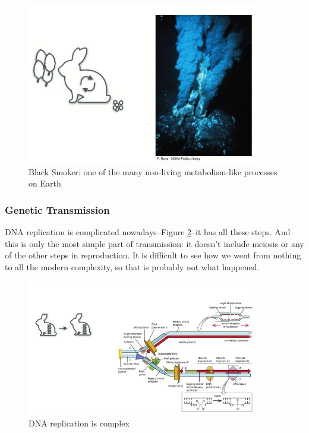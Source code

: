 \documentclass[]{article}
\begin{document}
\begin{figure}[H]
	\caption[Black Smoker]{Black Smoker: one of the many non-living metabolism-like processes on Earth}\label{fig:BlackSmoker}
	\includegraphics[width=0.9\textwidth]{BlackSmoker}
\end{figure}

\subsubsection{Genetic Transmission}

DNA replication is complicated nowadays--Figure \ref{fig:DNA_replication_complex}--it has all these steps. And this is only the most simple part of transmission: it doesn't include meiosis or any of the other steps in reproduction. It is difficult to see how we went from nothing to all the modern complexity, so that is probably not what happened.
\begin{figure}[H]
	\caption{DNA replication is complex}\label{fig:DNA_replication_complex}
	\includegraphics[width=0.9\textwidth]{DNA_replication_complex}
\end{figure}
\end{document}
